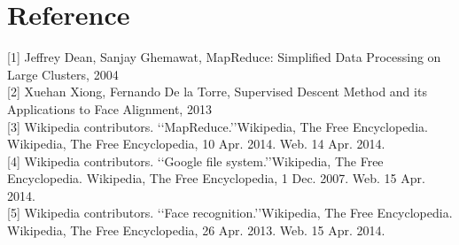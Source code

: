 \documentclass[12pt]{article}
\begin{document}
\section*{Reference}

[1] Jeffrey Dean, Sanjay Ghemawat, MapReduce: Simplified Data Processing on Large Clusters, 2004 \\
{[2]} Xuehan Xiong, Fernando De la Torre, Supervised Descent Method and its Applications to Face Alignment, 2013\\
{[3]} Wikipedia contributors. \lq\lq MapReduce.\rq\rq Wikipedia, The Free Encyclopedia. Wikipedia, The Free Encyclopedia, 10 Apr. 2014. Web. 14 Apr. 2014. \\
{[4]} Wikipedia contributors. \lq\lq Google file system.\rq\rq Wikipedia, The Free Encyclopedia. Wikipedia, The Free Encyclopedia, 1 Dec. 2007. Web. 15 Apr. 2014. \\
{[5]} Wikipedia contributors. \lq\lq Face recognition.\rq\rq Wikipedia, The Free Encyclopedia. Wikipedia, The Free Encyclopedia, 26 Apr. 2013. Web. 15 Apr. 2014.
\end{document}
